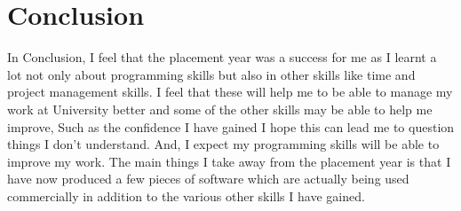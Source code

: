 \section{Conclusion}{
	In Conclusion, I feel that the placement year was a success for me as I learnt a lot not only about programming skills but also in other skills like time and project management skills. I feel that these will help me to be able to manage my work at University better and some of the other skills may be able to help me improve, Such as the confidence I have gained I hope this can lead me to question things I don't understand. And, I expect my programming skills will be able to improve my work. The main things I take away from the placement year is that I have now produced a few pieces of software which are actually being used commercially in addition to the various other skills I have gained.
}